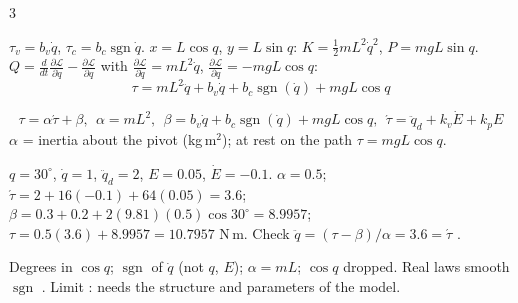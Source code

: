 \begin{multicols}{3}
\begin{deriv}
$\tau_v=b_v\dot q$, $\tau_c=b_c\operatorname{sgn}\dot q$. $x=L\cos q$, $y=L\sin q$: $K=\tfrac12mL^2\dot q^2$, $P=mgL\sin q$. $Q=\frac d{dt}\frac{\partial\mathcal L}{\partial\dot q}-\frac{\partial\mathcal L}{\partial q}$ with $\frac{\partial\mathcal L}{\partial\dot q}=mL^2\dot q$, $\frac{\partial\mathcal L}{\partial q}=-mgL\cos q$:
\[\boxed{\tau=mL^2\ddot q+b_v\dot q+b_c\operatorname{sgn}(\dot q)+mgL\cos q}\]
\end{deriv}
\begin{fbx}
\[\tau=\alpha\acute\tau+\beta,\ \ \alpha=mL^2,\ \ \beta=b_v\dot q+b_c\operatorname{sgn}(\dot q)+mgL\cos q,\ \ \acute\tau=\ddot q_d+k_v\dot E+k_pE\]
$\alpha$ = inertia about the pivot (kg\,m$^2$); at rest on the path $\tau=mgL\cos q$.
\end{fbx}
\begin{worked}[$m=2$, $L=0.5$, $b_v=0.3$, $b_c=0.2$, $k_p=64$, $k_v=16$]
$q=30^\circ$, $\dot q=1$, $\ddot q_d=2$, $E=0.05$, $\dot E=-0.1$. $\alpha=0.5$; $\acute\tau=2+16(-0.1)+64(0.05)=3.6$; $\beta=0.3+0.2+2(9.81)(0.5)\cos30^\circ=8.9957$; $\tau=0.5(3.6)+8.9957=10.7957$ N\,m. Check $\ddot q=(\tau-\beta)/\alpha=3.6=\acute\tau$ \checkmark. \chk
\end{worked}
\begin{trap}
Degrees in $\cos q$; $\operatorname{sgn}$ of $\dot q$ (not $q$, $E$); $\alpha=mL$; $\cos q$ dropped. Real laws smooth $\operatorname{sgn}$ \added. Limit : needs the structure and parameters of the model.
\end{trap}


\end{multicols}
